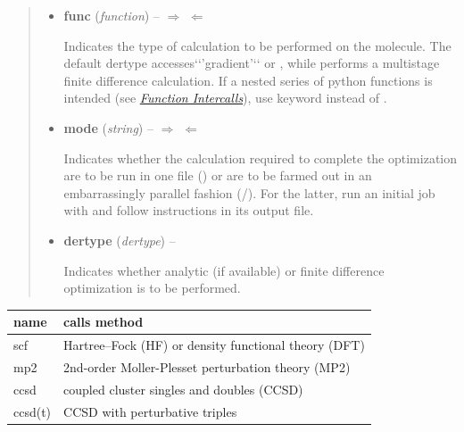 \documentclass[letterpaper,10pt,english]{sphinxmanual}
\begin{document}
\begin{fulllineitems}
\begin{quote}
\begin{description}
\begin{itemize}
\item {} 
\textbf{func} (\emph{function}) -- 
$\Rightarrow$  $\Leftarrow$ \textbar{}\textbar{}  \textbar{}\textbar{} 

Indicates the type of calculation to be performed on the molecule.
The default dertype accesses{}`{}`'gradient'{}`{}` or , while
 performs a multistage finite difference calculation.
If a nested series of python functions is intended (see {\hyperref[index:sec-intercalls]{\emph{Function Intercalls}}}),
use keyword  instead of .


\item {} 
\textbf{mode} (\emph{string}) -- 
$\Rightarrow$  $\Leftarrow$ \textbar{}\textbar{}  \textbar{}\textbar{} 

Indicates whether the calculation required to complete the
optimization are to be run in one file () or are to be
farmed out in an embarrassingly parallel fashion
(/).  For the latter, run an initial job with
 and follow instructions in its output file.


\item {} 
\textbf{dertype} (\emph{dertype}) -- 
 \textbar{}\textbar{} 

Indicates whether analytic (if available) or finite difference
optimization is to be performed.


\end{itemize}

\end{description}\end{quote}

\begin{tabulary}{\linewidth}{|L|L|}
\hline
\textbf{
name
} & \textbf{
calls method
}\\\hline

scf
 & 
Hartree--Fock (HF) or density functional theory (DFT)
\\\hline

mp2
 & 
2nd-order Moller-Plesset perturbation theory (MP2)
\\\hline

ccsd
 & 
coupled cluster singles and doubles (CCSD)
\\\hline

ccsd(t)
 & 
CCSD with perturbative triples
\\\hline


\end{tabulary}
\end{fulllineitems}
\end{document}
